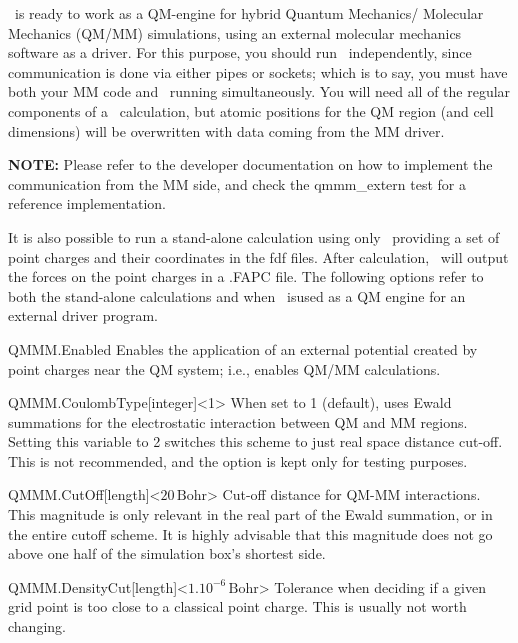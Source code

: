  \siesta\ is ready to work as a QM-engine for hybrid Quantum Mechanics/
 Molecular Mechanics (QM/MM) simulations, using an external molecular
 mechanics software as a driver.
 For this purpose, you should run \siesta\ independently, since communication
 is done via either pipes or sockets; which is to say, you must have both your
 MM code and \siesta\ running simultaneously. You will need all of the
 regular components of a \siesta\ calculation, but atomic positions for the
 QM region (and cell dimensions) will be overwritten with data coming from
 the MM driver.

 \textbf{NOTE:} Please refer to the developer documentation on how to
 implement the communication from the MM side, and check the qmmm\_extern
 test for a reference implementation.

 It is also possible to run a stand-alone calculation using only \siesta\,
 providing a set of point charges and their coordinates in the fdf files.
 After calculation, \siesta\ will output the forces on the point charges in
 a .FAPC file. The following options refer to both the stand-alone
 calculations and when \siesta\ isused as a QM engine for an external driver
 program.

 \begin{fdflogicalF}{QMMM.Enabled}
  Enables the application of an external potential created by point charges
  near the QM system; i.e., enables QM/MM calculations.

 \end{fdflogicalF}

 \begin{fdfentry}{QMMM.CoulombType}[integer]<1>
  When set to 1 (default), uses Ewald summations for the electrostatic
  interaction between QM and MM regions.
  Setting this variable to 2 switches this scheme to just real space
  distance cut-off. This is not recommended, and the option is kept only
  for testing purposes.
 \end{fdfentry}

 \begin{fdfentry}{QMMM.CutOff}[length]<$20\,\mathrm{Bohr}$>
  Cut-off distance for QM-MM interactions. This magnitude is only relevant
  in the real part of the Ewald summation, or in the entire cutoff scheme.
  It is highly advisable that this magnitude does not go above one half
  of the simulation box's shortest side.

 \end{fdfentry}

 \begin{fdfentry}{QMMM.DensityCut}[length]<$1.10^{-6}\,\mathrm{Bohr}$>
  Tolerance when deciding if a given grid point is too close to a
  classical point charge. This is usually not worth changing.

 \end{fdfentry}

